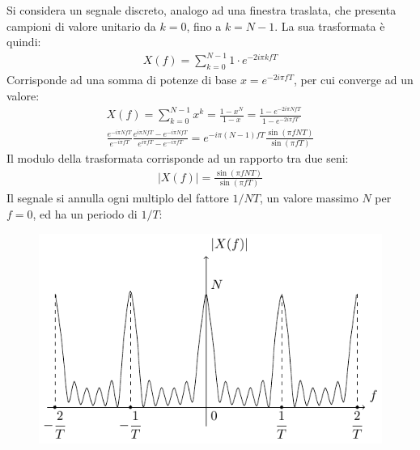 \documentclass{article}
\numberwithin{equation}{subsection}
\begin{document}
Si considera un segnale discreto, analogo ad una finestra traslata, che presenta campioni di valore unitario da $k=0$, fino a $k=N-1$. La sua trasformata è quindi:
\begin{gather*}
    X(f)=\displaystyle\sum_{k=0}^{N-1}1\cdot e^{-2i\pi kfT}
\end{gather*}
Corrisponde ad una somma di potenze di base $x=e^{-2i\pi fT}$, per cui converge ad un valore:
\begin{gather*}
    X(f)=\displaystyle\sum_{k=0}^{N-1}x^k=\frac{1-x^N}{1-x}=\frac{1-e^{-2i\pi NfT}}{1-e^{-2i\pi fT}}\\
    \frac{e^{-i\pi NfT}}{e^{-i\pi fT}}\frac{e^{i\pi NfT}-e^{-i\pi NfT}}{e^{i\pi fT}-e^{-i\pi fT}}=e^{-i\pi(N-1)fT}\frac{\sin(\pi fNT)}{\sin(\pi fT)}
\end{gather*}
Il modulo della trasformata corrisponde ad un rapporto tra due seni:
\begin{gather*}
    |X(f)|=\displaystyle\frac{\sin(\pi fNT)}{\sin(\pi fT)}
\end{gather*}
Il segnale si annulla ogni multiplo del fattore $1/NT$, un valore massimo $N$ per $f=0$, ed ha un periodo di $1/T$:
\begin{figure}[H]%
    \centering
    \includegraphics{trasformata-discreta-1.pdf}%
\end{figure}
\end{document}
